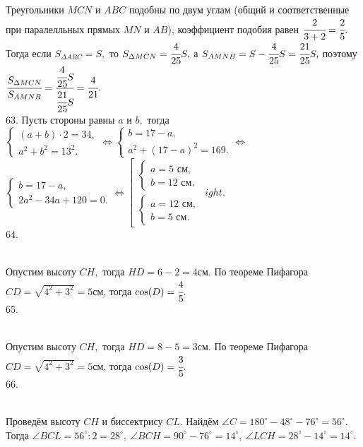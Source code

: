 Треугольники $MCN$ и $ABC$ подобны по двум углам (общий и соответственные при паралелльных прямых $MN$ и $AB$), коэффициент подобия равен $\cfrac{2}{3+2}=\cfrac{2}{5}.$ Тогда если $S_{\Delta ABC}=S,$ то $S_{\Delta MCN}=\cfrac{4}{25}S,$ а $S_{AMNB}=S-\cfrac{4}{25}S=\cfrac{21}{25}S,$ поэтому $\cfrac{S_{\Delta MCN}}{S_{AMNB}}=\cfrac{\cfrac{4}{25}S}{\cfrac{21}{25}S}=\cfrac{4}{21}.$\\
63. Пусть стороны равны $a$ и $b,$ тогда $\begin{cases}(a+b)\cdot2=34,\\ a^2+b^2=13^2.\end{cases}\Leftrightarrow
\begin{cases}b=17-a,\\ a^2+(17-a)^2=169.\end{cases}\Leftrightarrow$\\$
\begin{cases}b=17-a,\\ 2a^2-34a+120=0.\end{cases}\Leftrightarrow
\left[\begin{array}{l}\begin{cases}a=5\text{ см},\\ b=12\text{ см}.\end{cases}\\ \begin{cases}a=12\text{ см},\\ b=5\text{ см}.\end{cases}\end{array}
ight.$\\
64. \begin{figure}[ht!]
\end{figure}\\
Опустим высоту $CH,$ тогда $HD=6-2=4$см. По теореме Пифагора $CD=\sqrt{4^2+3^2}=5$см, тогда $\cos(D)=\cfrac{4}{5}.$\\
65. \begin{figure}[ht!]
\end{figure}\\
Опустим высоту $CH,$ тогда $HD=8-5=3$см. По теореме Пифагора $CD=\sqrt{4^2+3^2}=5$см, тогда $\cos(D)=\cfrac{3}{5}.$\\
66. \begin{figure}[ht!]
\end{figure}\\
Проведём высоту $CH$ и биссектрису $CL.$ Найдём $\angle C=180^\circ-48^\circ-76^\circ=56^\circ.$ Тогда $\angle BCL=56^\circ:2=28^\circ,\ \angle BCH=90^\circ-76^\circ=14^\circ,\ \angle LCH=28^\circ-14^\circ=14^\circ.$\\
